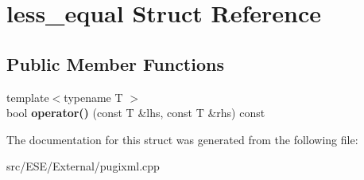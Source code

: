 \hypertarget{structless__equal}{\section{less\-\_\-equal Struct Reference}
\label{structless__equal}
}
\subsection*{Public Member Functions}
\begin{DoxyCompactItemize}
\item 
\hypertarget{structless__equal_a88d7a445c55ca234e3595aa086ff6a7d}{{\footnotesize template$<$typename T $>$ }\\bool {\bfseries operator()} (const T \&lhs, const T \&rhs) const }\label{structless__equal_a88d7a445c55ca234e3595aa086ff6a7d}

\end{DoxyCompactItemize}


The documentation for this struct was generated from the following file\-:\begin{DoxyCompactItemize}
\item 
src/\-E\-S\-E/\-External/pugixml.\-cpp\end{DoxyCompactItemize}
